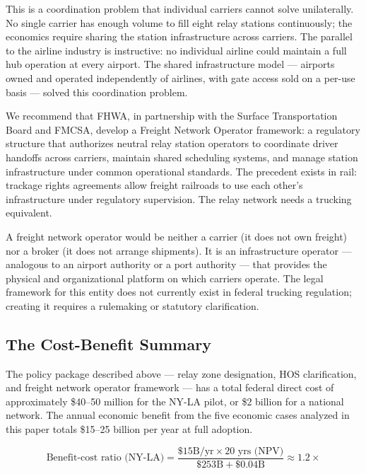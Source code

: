 This is a coordination problem that individual carriers cannot solve unilaterally. No single
carrier has enough volume to fill eight relay stations continuously; the economics require
sharing the station infrastructure across carriers. The parallel to the airline industry is
instructive: no individual airline could maintain a full hub operation at every airport.
The shared infrastructure model --- airports owned and operated independently of airlines,
with gate access sold on a per-use basis --- solved this coordination problem.

We recommend that FHWA, in partnership with the Surface Transportation Board and FMCSA,
develop a Freight Network Operator framework: a regulatory structure that authorizes neutral
relay station operators to coordinate driver handoffs across carriers, maintain shared
scheduling systems, and manage station infrastructure under common operational standards.
The precedent exists in rail: trackage rights agreements allow freight railroads to use
each other's infrastructure under regulatory supervision. The relay network needs a
trucking equivalent.

A freight network operator would be neither a carrier (it does not own freight) nor a
broker (it does not arrange shipments). It is an infrastructure operator --- analogous
to an airport authority or a port authority --- that provides the physical and
organizational platform on which carriers operate. The legal framework for this entity
does not currently exist in federal trucking regulation; creating it requires a rulemaking
or statutory clarification.

\subsection{The Cost-Benefit Summary}

The policy package described above --- relay zone designation, HOS clarification, and
freight network operator framework --- has a total federal direct cost of approximately
\$40--50 million for the NY-LA pilot, or \$2 billion for a national network. The annual
economic benefit from the five economic cases analyzed in this paper totals \$15--25 billion
per year at full adoption.

\begin{equation}
\text{Benefit-cost ratio (NY-LA)} = \frac{\$15\text{B/yr} \times 20 \text{ yrs (NPV)}}{{\$253\text{B}} + \$0.04\text{B}} \approx 1.2\times
\end{equation}


